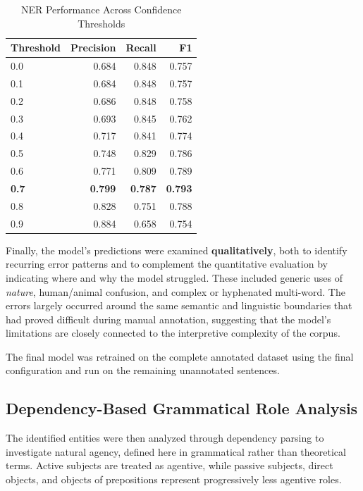 \documentclass[11pt]{article}
\begin{document}
\begin{table}[t]
\centering
\caption{NER Performance Across Confidence Thresholds}
\label{tab:threshold}
\vspace{4pt}
\begin{tabular}{lrrr}
\toprule
\textbf{Threshold} & \textbf{Precision} & \textbf{Recall} & \textbf{F1} \\
\midrule
0.0 & 0.684 & 0.848 & 0.757 \\
0.1 & 0.684 & 0.848 & 0.757 \\
0.2 & 0.686 & 0.848 & 0.758 \\
0.3 & 0.693 & 0.845 & 0.762 \\
0.4 & 0.717 & 0.841 & 0.774 \\
0.5 & 0.748 & 0.829 & 0.786 \\
0.6 & 0.771 & 0.809 & 0.789 \\
\textbf{0.7} & \textbf{0.799} & \textbf{0.787} & \textbf{0.793} \\
0.8 & 0.828 & 0.751 & 0.788 \\
0.9 & 0.884 & 0.658 & 0.754 \\
\bottomrule
\end{tabular}
\end{table}

Finally, the model’s predictions were examined \textbf{qualitatively}, both to identify recurring error patterns and to complement the quantitative evaluation by indicating where and why the model struggled. These included generic uses of \textit{nature}, human/animal confusion, and complex or hyphenated multi-word. The errors largely occurred around the same semantic and linguistic boundaries that had proved difficult during manual annotation, suggesting that the model’s limitations are closely connected to the interpretive complexity of the corpus.

The final model was retrained on the complete annotated dataset using the final configuration and run on the remaining unannotated sentences.


\subsection{Dependency-Based Grammatical Role Analysis}
The identified entities were then analyzed through dependency parsing to investigate natural agency, defined here in grammatical rather than theoretical terms. Active subjects are treated as agentive, while passive subjects, direct objects, and objects of prepositions represent progressively less agentive roles.
\end{document}
